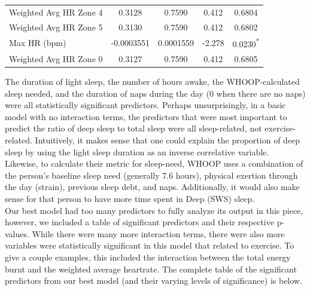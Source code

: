\documentclass{article}
\begin{document}
\begin{table}[h!]
\begin{tabular}{lcccc}
Weighted Avg HR Zone 4          & 0.3128              & 0.7590              & 0.412            & 0.6804           \\
Weighted Avg HR Zone 5          & 0.3130              & 0.7590              & 0.412            & 0.6802           \\
Max HR (bpm)                    & -0.0003551          & 0.0001559           & -2.278           & 0.0230\textsuperscript{*} \\
Weighted Avg HR Zone 0          & 0.3127              & 0.7590              & 0.412            & 0.6805           \\ \hline
\end{tabular}
\label{tab:baseline_model_outputs}
\end{table}



The duration of light sleep, the number of hours awake, the WHOOP-calculated sleep needed, and the duration of naps during the day (0 when there are no naps) were all statistically significant predictors. Perhaps unsurprisingly, in a basic model with no interaction terms, the predictors that were most important to predict the ratio of deep sleep to total sleep were all sleep-related, not exercise-related. Intuitively, it makes sense that one could explain the proportion of deep sleep by using the light sleep duration as an inverse correlative variable. \\

Likewise, to calculate their metric for sleep-need, WHOOP uses a combination of the person’s baseline sleep need (generally 7.6 hours), physical exertion through the day (strain), previous sleep debt, and naps. Additionally, it would also make sense for that person to have more time spent in Deep (SWS) sleep. \cite{whoop_sleep}\cite{whoop_sleep_debt} \\

Our best model had too many predictors to fully analyze its output in this piece, however, we included a table of significant predictors and their respective p-values. While there were many more interaction terms, there were also more variables were statistically significant in this model that related to exercise. To give a couple examples, this included the interaction between the total energy burnt and the weighted average heartrate. The complete table of the significant predictors from our best model (and their varying levels of significance) is below.
\end{document}
